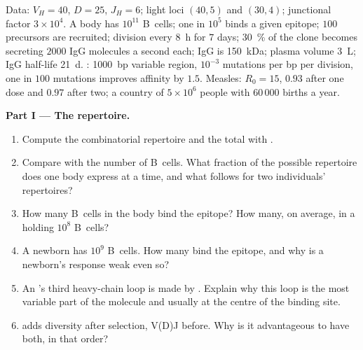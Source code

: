 \begin{problem}
\label{pb:b3:adaptive-immunity:1}
Data: $V_{H} = 40$, $D = 25$, $J_{H} = 6$; light loci $(40, 5)$ and
$(30, 4)$; junctional factor $3\times 10^{4}$. A body has $10^{11}$
B~cells; one in $10^{5}$ binds a given epitope; $100$ precursors are
recruited; division every \qty{8}{h} for $7$ days; \qty{30}{\%} of the
clone becomes  secreting $2000$ IgG molecules a second
each; IgG is \qty{150}{kDa}; plasma volume \qty{3}{L}; IgG half-life
\qty{21}{d}. : \qty{1000}{bp} variable region, $10^{-3}$
mutations per bp per division, one in $100$ mutations improves
affinity by $1.5$. Measles: $R_{0} = 15$,  $0.93$
after one dose and $0.97$ after two; a country of $5\times 10^{6}$
people with $60\,000$ births a year.

\medskip
\noindent\textbf{Part I --- The repertoire.}
\begin{enumerate}
  \item Compute the combinatorial repertoire and the total with
        .
  \item Compare with the number of B~cells. What fraction of the
        possible repertoire does one body express at a time, and what
        follows for two individuals' repertoires?
  \item How many B~cells in the body bind the epitope? How many, on
        average, in a  holding $10^{8}$ B~cells?
  \item A newborn has $10^{9}$ B~cells. How many bind the epitope, and
        why is a newborn's response weak even so?
  \item An 's third heavy-chain loop is made by . Explain why this loop is the most variable part of
        the molecule and usually at the centre of the binding site.
  \item {} adds diversity after selection, V(D)J
        before. Why is it advantageous to have both, in that order?
\end{enumerate}


\end{problem}
